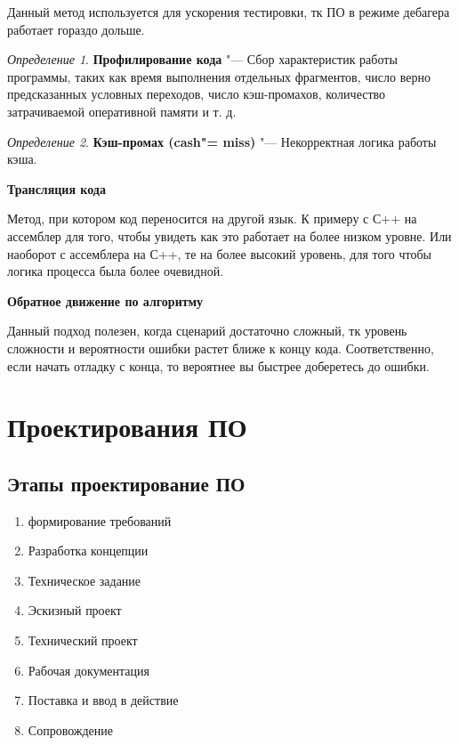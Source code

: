 \documentclass[bachelor, och, pract]{SCWorks}
\theoremstyle{remark}
\newtheorem{definition}{Определение}
\begin{document}
    Данный метод используется для ускорения тестировки, тк ПО в режиме дебагера работает гораздо дольше.

    \begin{definition}
        \textbf{Профилирование кода} "--- Сбор характеристик работы программы, таких как время выполнения отдельных фрагментов, число верно предсказанных условных переходов, число кэш-промахов, количество затрачиваемой оперативной памяти и т. д. 
    \end{definition}

    \begin{definition}
        \textbf{Кэш-промах (cash"= miss)} "--- Некорректная логика работы кэша. 
    \end{definition}

    \hfill \break
    \textbf{Трансляция кода}

    Метод, при котором код переносится на другой язык. К примеру с С++ на ассемблер для того, чтобы увидеть как это работает на более низком уровне. Или наоборот с ассемблера на С++, те на более высокий уровень, для того чтобы логика процесса была более очевидной.

    \hfill \break
    \textbf{Обратное движение по алгоритму} 

    Данный подход полезен, когда сценарий достаточно сложный, тк уровень сложности и вероятности ошибки растет ближе к концу кода. Соответственно, если начать отладку с конца, то вероятнее вы быстрее доберетесь до ошибки.


    \section{Проектирования ПО}
    
    \subsection{Этапы проектирование ПО}

    \begin{enumerate}
       \item формирование требований
        \item Разработка концепции 
        \item Техническое задание
        \item Эскизный проект 
        \item Технический проект
        \item Рабочая документация
        \item Поставка и ввод в действие
        \item Сопровождение
    \end{enumerate}
\end{document}
